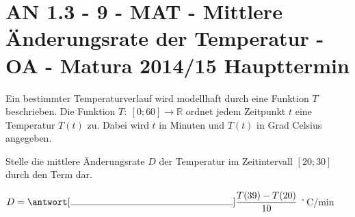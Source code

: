 \section{AN 1.3 - 9 - MAT - Mittlere Änderungsrate der Temperatur - OA - Matura 2014/15 Haupttermin}

\begin{beispiel}[AN 1.3]{1} %
Ein bestimmter Temperaturverlauf wird modellhaft durch eine Funktion $T$ beschrieben.
Die Funktion $T:~[0; 60] \rightarrow \mathbb{R}$ ordnet jedem Zeitpunkt $t$ eine Temperatur $T(t)$ zu. Dabei wird $t$ in Minuten und $T(t)$ in Grad Celsius angegeben.

Stelle die mittlere Änderungsrate $D$ der Temperatur im Zeitintervall $[20;30]$ durch den Term dar. \leer

$D= \antwort[\rule{6cm}{0.3pt}]{\dfrac{T(39)-T(20)}{10}}$ $^\circ$\,C/min
\end{beispiel}